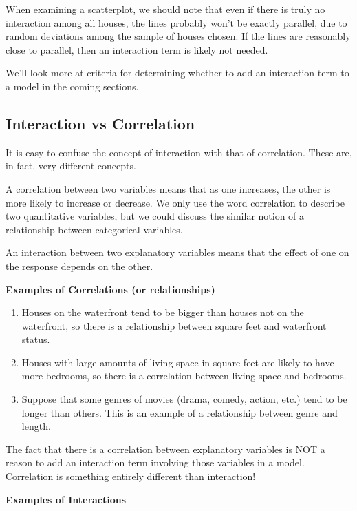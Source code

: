\documentclass[
  letterpaper,
  DIV=11,
  numbers=noendperiod]{scrreprt}
\begin{document}
When examining a scatterplot, we should note that even if there is truly
no interaction among all houses, the lines probably won't be exactly
parallel, due to random deviations among the sample of houses chosen. If
the lines are reasonably close to parallel, then an interaction term is
likely not needed.

We'll look more at criteria for determining whether to add an
interaction term to a model in the coming sections.

\subsection{Interaction vs
Correlation}\label{interaction-vs-correlation}

It is easy to confuse the concept of interaction with that of
correlation. These are, in fact, very different concepts.

A correlation between two variables means that as one increases, the
other is more likely to increase or decrease. We only use the word
correlation to describe two quantitative variables, but we could discuss
the similar notion of a relationship between categorical variables.

An interaction between two explanatory variables means that the effect
of one on the response depends on the other.

\textbf{Examples of Correlations (or relationships)}

\begin{enumerate}
\def\labelenumi{\arabic{enumi}.}
\item
  Houses on the waterfront tend to be bigger than houses not on the
  waterfront, so there is a relationship between square feet and
  waterfront status.
\item
  Houses with large amounts of living space in square feet are likely to
  have more bedrooms, so there is a correlation between living space and
  bedrooms.
\item
  Suppose that some genres of movies (drama, comedy, action, etc.) tend
  to be longer than others. This is an example of a relationship between
  genre and length.
\end{enumerate}

The fact that there is a correlation between explanatory variables is
NOT a reason to add an interaction term involving those variables in a
model. Correlation is something entirely different than interaction!

\textbf{Examples of Interactions}
\end{document}

